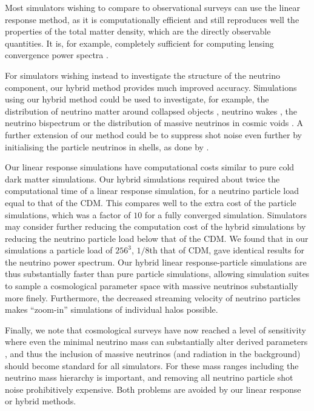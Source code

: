 \documentclass[useAMS, usenatbib]{mnras}
\begin{document}
Most simulators wishing to compare to observational surveys can use the linear response method, as it is computationally efficient and still reproduces well the properties of the total matter density, which are the directly observable quantities. It is, for example, completely sufficient for computing lensing convergence power spectra \citep{McCarthy_2018, Liu_2017}.

For simulators wishing instead to investigate the structure of the neutrino component, our hybrid method provides much improved accuracy. Simulations using our hybrid method could be used to investigate, for example, the distribution of neutrino matter around collapsed objects \citep{FVN_2013}, neutrino wakes \citep{Inman_2015}, the neutrino bispectrum \citep{Furhrer_2015} or the distribution of massive neutrinos in cosmic voids \citep{Banerjee_2016}. A further extension of our method could be to suppress shot noise even further by initialising the particle neutrinos in shells, as done by \cite{Banerjee_2018}.

Our linear response simulations have computational costs similar to pure cold dark matter simulations. Our hybrid simulations required about twice the computational time of a linear response simulation, for a neutrino particle load equal to that of the CDM. This compares well to the extra cost of the particle simulations, which was a factor of $10$ for a fully converged simulation. Simulators may consider further reducing the computation cost of the hybrid simulations by reducing the neutrino particle load below that of the CDM. We found that in our simulations a particle load of $256^3$, $1/8$th that of CDM, gave identical results for the neutrino power spectrum. Our hybrid linear response-particle simulations are thus substantially faster than pure particle simulations, allowing simulation suites to sample a cosmological parameter space with massive neutrinos substantially more finely. Furthermore, the decreased streaming velocity of neutrino particles makes ``zoom-in'' simulations of individual halos possible.

Finally, we note that cosmological surveys have now reached a level of sensitivity where even the minimal neutrino mass can substantially alter derived parameters \citep{Calabrese_2017}, and thus the inclusion of massive neutrinos (and radiation in the background) should become standard for all simulators. For these mass ranges including the neutrino mass hierarchy is important, and removing all neutrino particle shot noise prohibitively expensive. Both problems are avoided by our linear response or hybrid methods.
\end{document}
